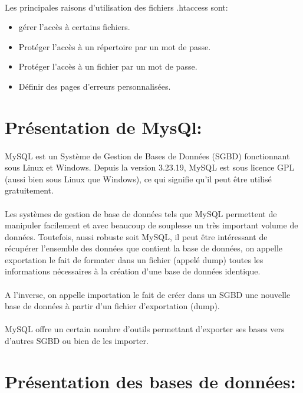 \paragraph{}
Les principales raisons d'utilisation des fichiers .htaccess sont:
\begin{itemize}
	\item gérer l'accès à certains fichiers.
	\item Protéger l'accès à un répertoire par un mot de passe.
	\item Protéger l'accès à un fichier par un mot de passe.
	\item Définir des pages d'erreurs personnalisées.
\end{itemize}
\section{Présentation de MysQl:}
\paragraph{}
MySQL est un Système de Gestion de Bases de Données (SGBD) fonctionnant sous Linux et Windows. Depuis la version 3.23.19, MySQL est sous licence GPL (aussi bien sous Linux que Windows), ce qui signifie qu'il peut être utilisé gratuitement.
\paragraph{}
Les systèmes de gestion de base de données tels que MySQL permettent de manipuler facilement et avec beaucoup de souplesse un très important volume de données. Toutefois, aussi robuste soit MySQL, il peut être intéressant de récupérer l'ensemble des données que contient la base de données, on appelle exportation le fait de formater dans un fichier (appelé dump) toutes les informations nécessaires à la création d'une base de données identique.
\paragraph{}
A l'inverse, on appelle importation le fait de créer dans un SGBD une nouvelle base de données à partir d'un fichier d'exportation (dump).
\paragraph{}
MySQL offre un certain nombre d'outils permettant d'exporter ses bases vers d'autres SGBD ou bien de les importer.

\section{Présentation des bases de données:}
